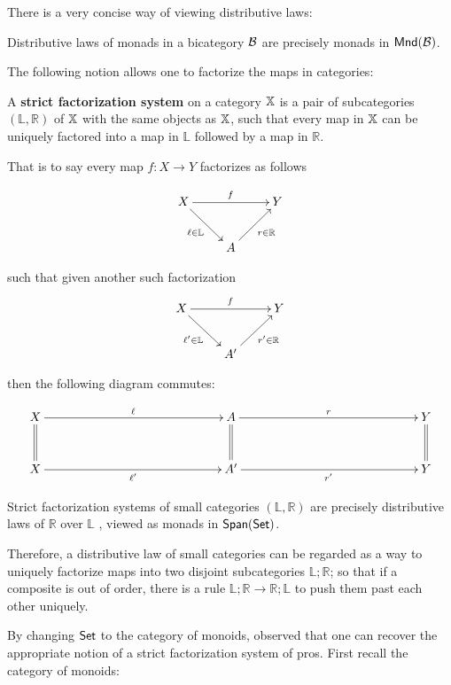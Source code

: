 There is a very concise way of viewing distributive laws:

\begin{lemma}
Distributive laws of monads in a bicategory $\cal B$ are precisely monads in ${\sf Mnd}({\cal B})$.
\end{lemma}


The following notion allows one to factorize the maps in categories:


\begin{definition}
A {\bf strict factorization system} on a category $\mathbb{X}$ is a pair of subcategories $(\mathbb{L},\mathbb{R})$ of $\mathbb{X}$ with the same objects as $\mathbb{X}$, such that every map in $\mathbb{X}$ can be uniquely factored into a map in $\mathbb{L}$ followed by a map in  $\mathbb{R}$.


That is to say every map $f:X\to Y$ factorizes as follows


$$
\xymatrix{
X  \ar[rr]^{f} \ar[dr]_{\ell \in {\mathbb L}} &       & Y\\
   & A \ar[ur]_{r \in {\mathbb R}}
}
$$

such that given another such factorization
$$
\xymatrix{
X  \ar[rr]^{f} \ar[dr]_{\ell' \in {\mathbb L}} &       & Y\\
   & A' \ar[ur]_{r' \in {\mathbb R}}
}
$$

then the following diagram commutes:

$$
\xymatrixrowsep{10mm}
\xymatrixcolsep{50mm}
\xymatrix{
X \ar@{=}[d] \ar[r]^{\ell}   & A  \ar@{=}[d] \ar[r]^{r} & Y \ar@{=}[d]\\
X   \ar[r]_{\ell'}                & A' \ar[r]_{r'} & Y
}
$$
\end{definition}

\begin{lemma}
\label{lemma:rosebrugh}
Strict factorization systems of small categories $(\mathbb L,\mathbb R)$ are precisely distributive laws of $\mathbb R$ over $\mathbb L$ , viewed as monads in $\mathsf{Span}(\mathsf{Set})$.
\end{lemma}

Therefore, a distributive law of small categories can be regarded as a way to uniquely factorize maps into two disjoint subcategories $\mathbb{L};\mathbb{R}$; so that if a composite is out of order, there is a rule $\mathbb{L};\mathbb{R}\to \mathbb{R};\mathbb{L}$ to push them past each other uniquely.


By changing $\mathsf{Set}$ to the category of monoids, \cite{lack} observed that one can recover the appropriate notion of a strict factorization system of pros.  First recall the category of monoids: 

